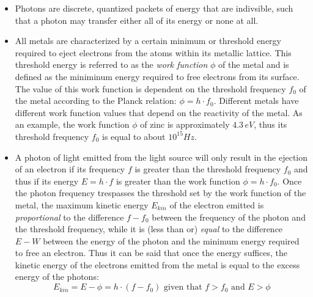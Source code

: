 \begin{itemize}
	
	\item Photons are discrete, quantized packets of energy that are indivsible, such that a photon may transfer either all of its energy or none at all. 

	\item All metals are characterized by a certain minimum or threshold energy required to eject electrons from the atoms within its metallic lattice. This threshold energy is referred to as the \emph{work function} $\phi$ of the metal and is defined as the miniminum energy required to free electrons from its surface. The value of this work function is dependent on the threshold frequency $f_0$ of the metal according to the Planck relation: $\phi = h \cdot f_0$. Different metals have different work function values that depend on the reactivity of the metal. As an example, the work function $\phi$ of zinc is approximately $4.3\, eV$, thus its threshold frequency $f_0$ is equal to about $10^{15} Hz$. 

	\item A photon of light emitted from the light source will only result in the ejection of an electron if its frequency $f$ is greater than the threshold frequency $f_0$ and thus if its energy $E = h \cdot f$ is greater than the work function $\phi = h \cdot f_0$. Once the photon frequency trespasses the threshold set by the work function of the metal, the maximum kinetic energy $E_{kin}$ of the electron emitted is \emph{proportional} to the difference $f - f_0$ between the frequency of the photon and the threshold frequency, while it is (less than or) \emph{equal} to the difference $E - W$ between the energy of the photon and the minimum energy required to free an electron. Thus it can be said that once the energy suffices, the kinetic energy of the electrons emitted from the metal is equal to the excess energy of the photons: $$E_{kin} = E - \phi = h \cdot (f - f_0) \text{ given that } f > f_0 \text{ and } E > \phi$$


\end{itemize}
